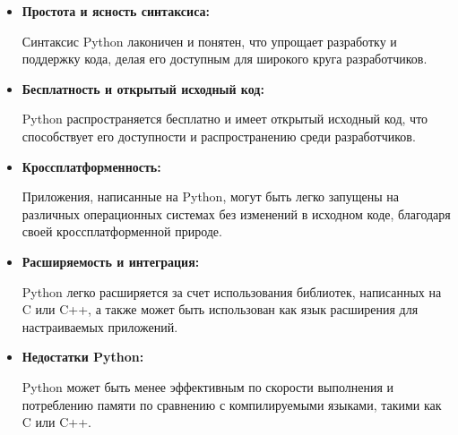 \begin{itemize}

   \item  \textbf{Простота и ясность синтаксиса:} ~\cite{wikiRUHabr6}
   
   Синтаксис Python лаконичен и понятен, что упрощает разработку и поддержку кода, делая его доступным для широкого круга разработчиков.

   \item  \textbf{Бесплатность и открытый исходный код:}
   
   Python распространяется бесплатно и имеет открытый исходный код, что способствует его доступности и распространению среди разработчиков.

   \item  \textbf{Кроссплатформенность:} ~\cite{wikiRUHabr3}
   
   Приложения, написанные на Python, могут быть легко запущены на различных операционных системах без изменений в исходном коде, благодаря своей кроссплатформенной природе.

   \item  \textbf{Расширяемость и интеграция:}
   
   Python легко расширяется за счет использования библиотек, написанных на C или C++, а также может быть использован как язык расширения для настраиваемых приложений.
   
   \item  \textbf{Недостатки Python:} ~\cite{wikiRUHabr2}
   
     Python может быть менее эффективным по скорости выполнения и потреблению памяти по сравнению с компилируемыми языками, такими как C или C++. 
    
\end{itemize}
